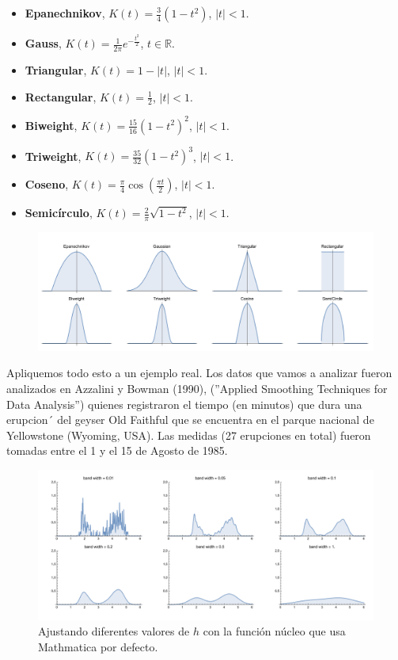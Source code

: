 \begin{itemize}
    \item \textbf{Epanechnikov}, $K(t) = \frac{3}{4}(1-t^2)$, $|t| < 1$.
    \item \textbf{Gauss}, $K(t) = \frac{1}{2\pi} e^{-\frac{t^2}{2}}$, $t \in \mathbb{R}$.
    \item \textbf{Triangular}, $K(t) = 1 - |t|$, $|t| < 1$.
    \item \textbf{Rectangular}, $K(t) = \frac{1}{2}$, $|t| < 1$.
    \item \textbf{Biweight}, $K(t) = \frac{15}{16}(1-t^2)^2$, $|t| < 1$.
    \item \textbf{Triweight}, $K(t) = \frac{35}{32}(1-t^2)^3$, $|t| < 1$.
    \item \textbf{Coseno}, $K(t) = \frac{\pi}{4} \cos \left( \frac{\pi t}{2} \right)$, $|t| < 1$.
    \item \textbf{Semicírculo}, $K(t) = \frac{2}{\pi} \sqrt{1 -  t^2}$, $|t| < 1$.
\end{itemize}

\begin{figure}[H]
    \centering
    \includegraphics[width=1.1\textwidth]{imagenes6/nucleos.png}
\end{figure}
\noindent Apliquemos todo esto a un ejemplo real. Los datos que vamos a analizar fueron analizados en Azzalini y Bowman (1990), (”Applied Smoothing Techniques for Data Analysis”) quienes registraron el tiempo (en minutos) que dura una erupcion´ del geyser Old Faithful que se encuentra en el parque nacional de Yellowstone (Wyoming, USA). Las medidas (27 erupciones en total) fueron tomadas entre el 1 y el 15 de Agosto de 1985.
\begin{figure}[H]
    \centering
    \includegraphics[width=1\textwidth]{imagenes6/nucleo1.png}
    \caption{Ajustando diferentes valores de $h$ con la función núcleo que usa Mathmatica por defecto.}
\end{figure}

